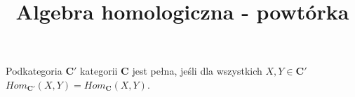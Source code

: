 \documentclass{article}
\title{Algebra homologiczna - powtórka}
\author{}
\date{}
\begin{document}
\maketitle 

\begin{multicols}{4}

\begin{deff}
  \label{podkategoria pelna}
  Podkategoria $\mathbf{C}'$ kategorii $\mathbf{C}$ jest pełna, jeśli dla wszystkich $X,Y\in\mathbf{C}'$ $Hom_{\mathbf{C}'}(X, Y)=Hom_{\mathbf{C}}(X, Y)$.
\end{deff}


\end{multicols}
\end{document}

